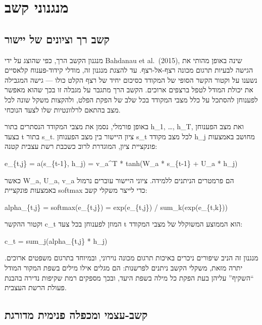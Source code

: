 \hypertarget{ux5deux5e0ux5d2ux5e0ux5d5ux5e0ux5d9-ux5e7ux5e9ux5d1}{%
\section{מנגנוני
קשב}\label{ux5deux5e0ux5d2ux5e0ux5d5ux5e0ux5d9-ux5e7ux5e9ux5d1}}

\hypertarget{ux5e7ux5e9ux5d1-ux5e8ux5da-ux5d5ux5e6ux5d9ux5d5ux5e0ux5d9ux5dd-ux5e9ux5dc-ux5d9ux5d9ux5e9ux5d5ux5e8}{%
\subsection{קשב רך וציונים של
יישור}\label{ux5e7ux5e9ux5d1-ux5e8ux5da-ux5d5ux5e6ux5d9ux5d5ux5e0ux5d9ux5dd-ux5e9ux5dc-ux5d9ux5d9ux5e9ux5d5ux5e8}}

מנגנון הקשב הרך, כפי שהוצג על ידי Bahdanau et al.~(2015), שינה באופן
מהותי את הגישה לבעיות תרגום מכונה רצף-אל-רצף. עד להצגת מנגנון זה, מודלי
קידוד-פענוח קלאסיים נשענו על וקטור הקשר הסופי של המקודד כסיכום יחיד של
רצף הקלט כולו --- גישה המגבילה את יכולת המודל לטפל ברצפים ארוכים. הקשב
הרך מתגבר על מגבלה זו בכך שהוא מאפשר לפענוחן להסתכל על כלל מצבי המקודד
בכל שלב של הפקת הפלט, ולהקצות משקל שונה לכל מצב בהתאם לרלוונטיות שלו
לצעד הנוכחי.

באופן פורמלי, נסמן את מצבי המקודד הנסתרים בתור h\_1, \ldots, h\_T, ואת
מצב הפענוחן בצעד t בתור s\_t. ציון היישור בין מצב הפענוחן s\_t לכל מצב
מקודד h\_j מחושב באמצעות פונקציית ציון, המוגדרת לרוב כשכבת רשת עצבית
קטנה:

e\_\{t,j\} = a(s\_\{t-1\}, h\_j) = v\_a\^{}T * tanh(W\_a * s\_\{t-1\} +
U\_a * h\_j)

כאשר W\_a, U\_a, v\_a הם פרמטרים הניתנים ללמידה. ציוני היישור עוברים
נרמול באמצעות פונקציית softmax כדי לייצר משקלי קשב:

alpha\_\{t,j\} = softmax(e\_\{t,j\}) = exp(e\_\{t,j\}) /
sum\_k(exp(e\_\{t,k\}))

וקטור ההקשר c\_t המוזן לפענוחן בכל צעד t הוא הממוצע המשוקלל של מצבי
המקודד:

c\_t = sum\_j(alpha\_\{t,j\} * h\_j)

מנגנון זה הניב שיפורים ניכרים באיכות תרגום מכונה נוירוני, ובמיוחד בתרגום
משפטים ארוכים. יתרה מזאת, משקלי הקשב ניתנים לפרשנות: הם מגלים אילו מילים
בשפת המקור המודל ``השקיף'' עליהן בעת הפקת כל מילה בשפת היעד, ובכך מספקים
רמת שקיפות נדירה בהבנת פעולת הרשת העצבית.

\hypertarget{ux5e7ux5e9ux5d1-ux5e2ux5e6ux5deux5d9-ux5d5ux5deux5dbux5e4ux5dcux5d4-ux5e4ux5e0ux5d9ux5deux5d9ux5ea-ux5deux5d3ux5d5ux5e8ux5d2ux5ea}{%
\subsection{קשב-עצמי ומכפלה פנימית
מדורגת}\label{ux5e7ux5e9ux5d1-ux5e2ux5e6ux5deux5d9-ux5d5ux5deux5dbux5e4ux5dcux5d4-ux5e4ux5e0ux5d9ux5deux5d9ux5ea-ux5deux5d3ux5d5ux5e8ux5d2ux5ea}}


